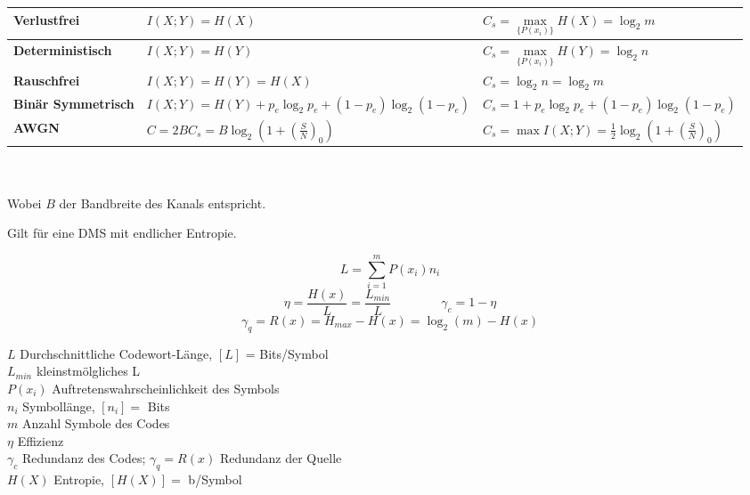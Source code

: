 	\renewcommand{\arraystretch}{2}
	\begin{tabular}{| p{3.5cm} | p{7.5cm} | p{6.5cm} |}
		\hline  
    		\textbf{Verlustfrei}
    			& $ I(X; Y) = H(X) $
    			& $ C_s = \max\limits_{\{ P(x_i) \}}{H (X)} = \log_2 m $ \\
		\hline
    		\textbf{Deterministisch}
    			& $ I(X; Y) = H(Y) $
    			& $ C_s = \max\limits_{\{ P(x_i) \}}{H (Y)} = \log_2 n $ \\
		\hline
    		\textbf{Rauschfrei}
    			& $ I(X; Y) = H(Y) = H(X)$
    			& $ C_s = \log_2 n = \log_2 m$ \\
		\hline
    		\textbf{Binär Symmetrisch}
    			& $ I(X; Y) = H(Y) + p_e \log_2 p_e + (1-p_e) \log_2 (1-p_e)$
    			& $ C_s = 1 + p_e \log_2 p_e + (1-p_e) \log_2 (1-p_e)$ \\
		\hline
    		\textbf{AWGN}
    			& $ C = 2 B C_s = B \log_2 (1 + \left(\frac{S}{N}\right)_0)$ 
    			& $ C_s = \max{I(X; Y) = \frac{1}{2} \log_2 (1 + \left(\frac{S}{N}\right)_0)}$ \\
		\hline
 	\end{tabular}
	\renewcommand{\arraystretch}{1} \\ \\
Wobei $B$ der Bandbreite des Kanals entspricht. 


Gilt für eine DMS mit endlicher Entropie. \\

\begin{minipage}[c]{8cm}
	$$ L = \sum\limits_{i=1}^m P(x_i) n_i $$
	$$ \eta = \frac{H(x)}{L} = \frac{L_{min}}{L} \qquad \qquad  \gamma_c = 1 -
	\eta $$
	$$ \gamma_q = R(x) = H_{max} - H(x) = \log_2(m) - H(x)$$
\end{minipage}
\begin{minipage}[c]{10cm}
	$L$ Durchschnittliche Codewort-Länge, $[L]$ = Bits/Symbol \\
	$L_{min}$ kleinstmölgliches L \\
	$P(x_i)$ Auftretenswahrscheinlichkeit des Symbols \\
	$n_i$ Symbollänge, $[n_i] = $ Bits \\
	$m$ Anzahl Symbole des Codes \\
	$\eta$ Effizienz \\
	$\gamma_c$ Redundanz des Codes; $\gamma_q = R(x)$ Redundanz der Quelle \\
	$H(X)$ Entropie, $[H(X)] = $ b/Symbol 
\end{minipage}

